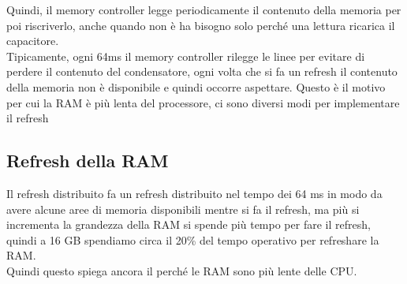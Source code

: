 \documentclass[12pt, oneside]{extbook} %
\begin{document}
Quindi, il memory controller legge periodicamente il contenuto della memoria per poi riscriverlo, anche quando non è ha bisogno solo perché una lettura ricarica il capacitore.\\Tipicamente, ogni 64ms il memory controller rilegge le linee per evitare di perdere il contenuto del condensatore, ogni volta che si fa un refresh il contenuto della memoria non è disponibile e quindi occorre aspettare. Questo è il motivo per cui la RAM è più lenta del processore, ci sono diversi modi per implementare il refresh

\subsection{Refresh della RAM}
Il refresh distribuito fa un refresh distribuito nel tempo dei 64 ms in modo da avere alcune aree di memoria disponibili mentre si fa il refresh, ma più si incrementa la grandezza della RAM si spende più tempo per fare il refresh, quindi a 16 GB spendiamo circa il 20\% del tempo operativo per refreshare la RAM.\\Quindi questo spiega ancora il perché le RAM sono più lente delle CPU.
\end{document}
